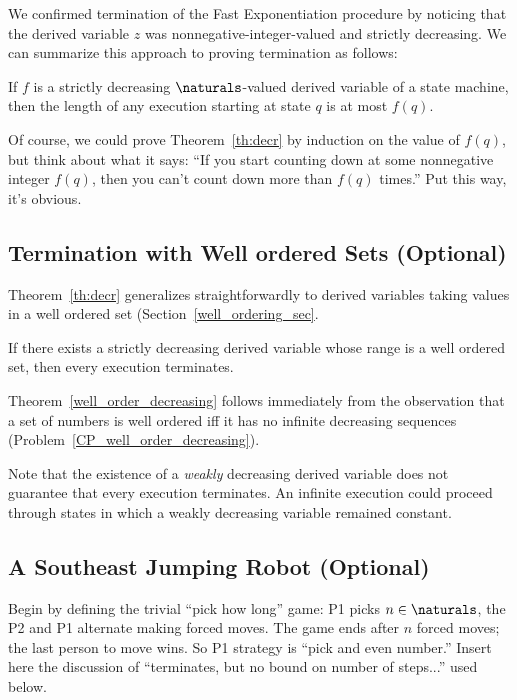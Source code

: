 We confirmed termination of the Fast Exponentiation procedure by
noticing that the derived variable $z$ was nonnegative-integer-valued
and strictly decreasing.  We can summarize this approach to proving
termination as follows:
\begin{theorem}\label{th:decr}
If $f$ is a strictly decreasing $\naturals$-valued derived variable of a
state machine, then the length of any execution starting at state $q$ is
at most $f(q)$.
\end{theorem}

Of course, we could prove Theorem~\ref{th:decr} by induction on the value
of $f(q)$, but think about what it says: ``If you start counting down at
some nonnegative integer $f(q)$, then you can't count down more than
$f(q)$ times.''  Put this way, it's obvious.


\subsection{Termination with Well ordered Sets (Optional)}

Theorem~\ref{th:decr} generalizes straightforwardly to derived
variables taking values in a well ordered set
(Section~\ref{well_ordering_sec}.

\begin{theorem}\label{well_order_decreasing}
  If there exists a strictly decreasing derived variable whose range
  is a well ordered set, then every execution terminates.
\end{theorem}

Theorem~\ref{well_order_decreasing} follows immediately from the
observation that a set of numbers is well ordered iff it has no
infinite decreasing sequences
(Problem~\ref{CP_well_order_decreasing}).

Note that the existence of a \emph{weakly} decreasing derived variable
does not guarantee that every execution terminates.  An
infinite execution could proceed through states in which a weakly
decreasing variable remained constant.


\subsection{A Southeast Jumping Robot (Optional)}

\iffalse Begin by defining the trivial ``pick how long'' game: P1 picks $n
\in \naturals$, the P2 and P1 alternate making forced moves.  The game
ends after $n$ forced moves; the last person to move wins.  So P1 strategy
is ``pick and even number.''  Insert here the discussion of ``terminates,
but no bound on number of steps...'' used below.

